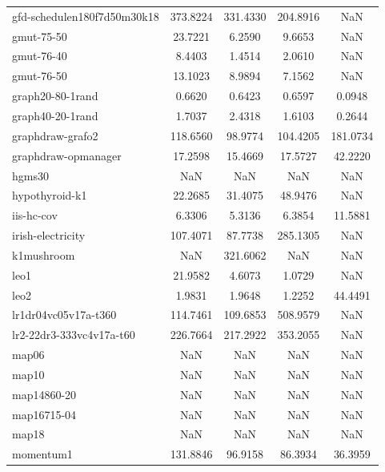 \begin{longtable}{lcccc}
gfd-schedulen180f7d50m30k18 &  373.8224 & 331.4330 &  204.8916 &       NaN \\
gmut-75-50                  &   23.7221 &   6.2590 &    9.6653 &       NaN \\
gmut-76-40                  &    8.4403 &   1.4514 &    2.0610 &       NaN \\
gmut-76-50                  &   13.1023 &   8.9894 &    7.1562 &       NaN \\
graph20-80-1rand            &    0.6620 &   0.6423 &    0.6597 &    0.0948 \\
graph40-20-1rand            &    1.7037 &   2.4318 &    1.6103 &    0.2644 \\
graphdraw-grafo2            &  118.6560 &  98.9774 &  104.4205 &  181.0734 \\
graphdraw-opmanager         &   17.2598 &  15.4669 &   17.5727 &   42.2220 \\
hgms30                      &       NaN &      NaN &       NaN &       NaN \\
hypothyroid-k1              &   22.2685 &  31.4075 &   48.9476 &       NaN \\
iis-hc-cov                  &    6.3306 &   5.3136 &    6.3854 &   11.5881 \\
irish-electricity           &  107.4071 &  87.7738 &  285.1305 &       NaN \\
k1mushroom                  &       NaN & 321.6062 &       NaN &       NaN \\
leo1                        &   21.9582 &   4.6073 &    1.0729 &       NaN \\
leo2                        &    1.9831 &   1.9648 &    1.2252 &   44.4491 \\
lr1dr04vc05v17a-t360        &  114.7461 & 109.6853 &  508.9579 &       NaN \\
lr2-22dr3-333vc4v17a-t60    &  226.7664 & 217.2922 &  353.2055 &       NaN \\
map06                       &       NaN &      NaN &       NaN &       NaN \\
map10                       &       NaN &      NaN &       NaN &       NaN \\
map14860-20                 &       NaN &      NaN &       NaN &       NaN \\
map16715-04                 &       NaN &      NaN &       NaN &       NaN \\
map18                       &       NaN &      NaN &       NaN &       NaN \\
momentum1                   &  131.8846 &  96.9158 &   86.3934 &   36.3959 \\

\end{longtable}
